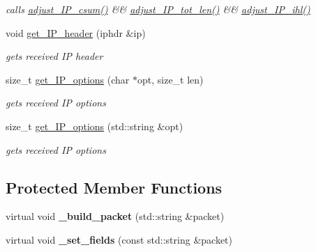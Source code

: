 \begin{CompactItemize}
\begin{CompactList}\small\item\em calls \hyperlink{classsocketpp_1_1IP__RawSocket_187bab79c6a8bae17b400a132063a9d1}{adjust\_\-IP\_\-csum()} \&\& \hyperlink{classsocketpp_1_1IP__RawSocket_32d2c08139fb43abb92679bdabecf778}{adjust\_\-IP\_\-tot\_\-len()} \&\& \hyperlink{classsocketpp_1_1IP__RawSocket_d84d5e193a15baf421c64011a9c27359}{adjust\_\-IP\_\-ihl()} \item\end{CompactList}\item 
void \hyperlink{classsocketpp_1_1IP__RawSocket_e477f483d5a8baa76c60399d0809d043}{get\_\-IP\_\-header} (iphdr \&ip)
\begin{CompactList}\small\item\em gets received IP header \item\end{CompactList}\item 
size\_\-t \hyperlink{classsocketpp_1_1IP__RawSocket_686fcc72997b0843b2ece0c4d8a5735d}{get\_\-IP\_\-options} (char $\ast$opt, size\_\-t len)
\begin{CompactList}\small\item\em gets received IP options \item\end{CompactList}\item 
size\_\-t \hyperlink{classsocketpp_1_1IP__RawSocket_c9bec0c1db60871bb1cb5560b97e02ed}{get\_\-IP\_\-options} (std::string \&opt)
\begin{CompactList}\small\item\em gets received IP options \item\end{CompactList}\end{CompactItemize}
\subsection*{Protected Member Functions}
\begin{CompactItemize}
\item 
\hypertarget{classsocketpp_1_1IP__RawSocket_6863cc399c543073e9aa3615c3f50940}{
virtual void \textbf{\_\-build\_\-packet} (std::string \&packet)}
\label{classsocketpp_1_1IP__RawSocket_6863cc399c543073e9aa3615c3f50940}

\item 
\hypertarget{classsocketpp_1_1IP__RawSocket_c39832f1ad83184cd5ba94c4c967f465}{
virtual void \textbf{\_\-set\_\-fields} (const std::string \&packet)}
\label{classsocketpp_1_1IP__RawSocket_c39832f1ad83184cd5ba94c4c967f465}

\end{CompactItemize}
